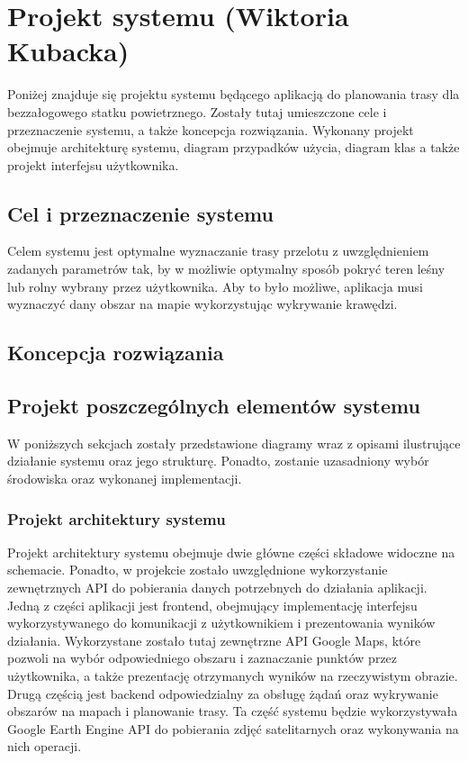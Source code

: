 \chapter{Projekt systemu (Wiktoria Kubacka)}
\label{chap:system project}

Poniżej znajduje się projektu systemu będącego aplikacją do planowania trasy dla bezzałogowego statku powietrznego. Zostały tutaj umieszczone cele i przeznaczenie systemu, a także koncepcja rozwiązania. Wykonany projekt obejmuje architekturę systemu, diagram przypadków użycia, diagram klas a także projekt interfejsu użytkownika. 

\section{Cel i przeznaczenie systemu}

Celem systemu jest optymalne wyznaczanie trasy przelotu z uwzględnieniem zadanych parametrów tak, by w możliwie optymalny sposób pokryć teren leśny lub rolny wybrany przez użytkownika. Aby to było możliwe, aplikacja musi wyznaczyć dany obszar na mapie wykorzystując wykrywanie krawędzi.

\section{Koncepcja rozwiązania}



\section{Projekt poszczególnych elementów systemu}

W poniższych sekcjach zostały przedstawione diagramy wraz z opisami ilustrujące działanie systemu oraz jego strukturę. Ponadto, zostanie uzasadniony wybór środowiska oraz wykonanej implementacji.

\subsection{Projekt architektury systemu}

Projekt architektury systemu obejmuje dwie główne części składowe widoczne na schemacie. Ponadto, w projekcie zostało uwzględnione wykorzystanie zewnętrznych API do pobierania danych potrzebnych do działania aplikacji. Jedną z części aplikacji jest frontend, obejmujący implementację interfejsu wykorzystywanego do komunikacji z użytkownikiem i prezentowania wyników działania. Wykorzystane zostało tutaj zewnętrzne API Google Maps, które pozwoli na wybór odpowiedniego obszaru i zaznaczanie punktów przez użytkownika, a także prezentację otrzymanych wyników na rzeczywistym obrazie. Drugą częścią jest backend odpowiedzialny za obsługę żądań oraz wykrywanie obszarów na mapach i planowanie trasy. Ta część systemu będzie wykorzystywała Google Earth Engine API do pobierania zdjęć satelitarnych oraz wykonywania na nich operacji.

